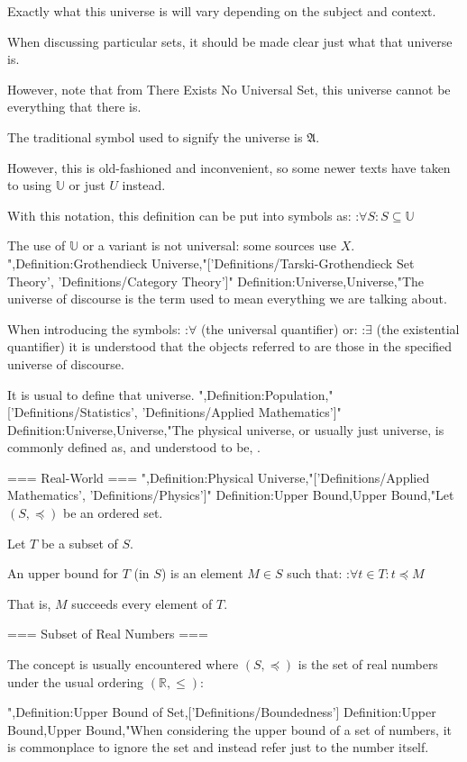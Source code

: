 Exactly what this universe is will vary depending on the subject and context.

When discussing particular sets, it should be made clear just what that universe is.

However, note that from There Exists No Universal Set, this universe cannot be everything that there is.


The traditional symbol used to signify the universe is $\mathfrak A$.

However, this is old-fashioned and inconvenient, so some newer texts have taken to using $\mathbb U$ or just $U$ instead.


With this notation, this definition can be put into symbols as:
:$\forall S: S \subseteq \mathbb U$


The use of $\mathbb U$ or a variant is not universal: some sources use $X$.
",Definition:Grothendieck Universe,"['Definitions/Tarski-Grothendieck Set Theory', 'Definitions/Category Theory']"
Definition:Universe,Universe,"The universe of discourse is the term used to mean everything we are talking about.


When introducing the symbols:
:$\forall$ (the universal quantifier)
or:
:$\exists$ (the existential quantifier)
it is understood that the objects referred to are those in the specified universe of discourse.

It is usual to define that universe.
",Definition:Population,"['Definitions/Statistics', 'Definitions/Applied Mathematics']"
Definition:Universe,Universe,"The physical universe, or usually just universe, is commonly defined as, and understood to be, .


=== Real-World ===
",Definition:Physical Universe,"['Definitions/Applied Mathematics', 'Definitions/Physics']"
Definition:Upper Bound,Upper Bound,"Let $\left( S, \preceq \right)$ be an ordered set.

Let $T$ be a subset of $S$.


An upper bound for $T$ (in $S$) is an element $M \in S$ such that:
:$\forall t \in T: t \preceq M$

That is, $M$ succeeds every element of $T$.


=== Subset of Real Numbers ===

The concept is usually encountered where $\left( S, \preceq \right)$ is the set of real numbers under the usual ordering $\left( \mathbb R, \le \right)$:

",Definition:Upper Bound of Set,['Definitions/Boundedness']
Definition:Upper Bound,Upper Bound,"When considering the upper bound of a set of numbers, it is commonplace to ignore the set and instead refer just to the number itself.

